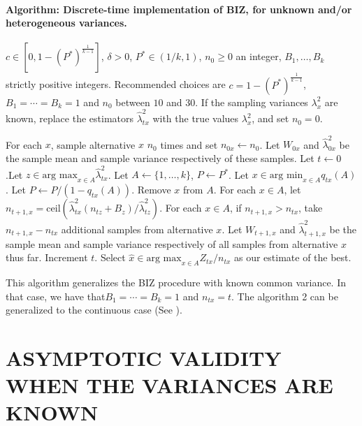 \documentclass{wscpaperproc}
\newcommand{\lambdahat}{\widehat{\lambda}}
\newcommand{\xhat}{\hat{x}}
\newcommand{\upthresh}{P}
\newcommand{\cmax}{1-(P^*)^{\frac1{k-1}}}
\newcommand{\ceil}{\mathrm{ceil}}
\theoremstyle{wsc}
\begin{document}
\paragraph{Algorithm: Discrete-time implementation of BIZ, for unknown and/or heterogeneous variances.}    
\begin{algorithmic}[1]   
\label{alg:hetero-BIZ}   
\REQUIRE $c \in [0,\cmax]$, $\delta>0$, $P^*\in(1/k,1)$, $n_0\ge0$ an integer, $B_1,\ldots,B_k$ strictly positive integers.  Recommended choices are $c=\cmax$, $B_1=\cdots=B_k=1$ and $n_0$ between $10$ and $30$.     If the sampling variances $\lambda^2_x$ are known, replace the estimators     
$\lambdahat^2_{tx}$ with the true values $\lambda^2_x$, and set $n_0=0$.     

\STATE For each $x$, sample alternative $x$ $n_0$ times and set $n_{0x} \leftarrow n_0$.     
Let $W_{0x}$ and $\lambdahat^2_{0x}$ be the sample mean and sample variance respectively of these samples.     Let $t\leftarrow 0$.Let $z \in \mbox{arg max}_{x\in A} \lambdahat^2_{tx}$.     
\STATE Let $A \leftarrow \{ 1,\ldots, k\}$, $\upthresh \leftarrow P^*$.
 \STATE Let $x\in\mbox{arg min}_{x\in A} q_{tx}\left(A\right)$.
    \STATE Let $\upthresh \leftarrow \upthresh/(1-q_{tx}\left(A\right))$.     
\STATE Remove $x$ from $A$.
\ENDWHILE    
\STATE For each $x\in A$, let      $n_{t+1,x} = \ceil\left( \lambdahat^2_{tx} (n_{tz} + B_z) / \lambdahat^2_{tz} \right)$.     \STATE For each $x\in A$, if $n_{t+1,x}>n_{tx}$, take $n_{t+1,x}-n_{tx}$ additional samples from alternative $x$.  Let $W_{t+1,x}$ and $\lambdahat^2_{t+1,x}$ be the sample mean and sample variance respectively of all samples from alternative $x$ thus far.    
\STATE Increment $t$.
 \ENDWHILE
  \STATE Select $\xhat \in\mbox{arg max}_{x\in A} Z_{tx} / n_{tx}$ as our estimate of the best.

   
\end{algorithmic} 

\vspace{10mm}
This algorithm generalizes the BIZ procedure with known common variance. In that case, we have that$B_1=\cdots=B_k=1$ and $n_{tx}=t$. The algorithm 2 can be generalized to the continuous case (See  ). 

\section{ASYMPTOTIC VALIDITY WHEN THE VARIANCES ARE KNOWN}
\end{document}
